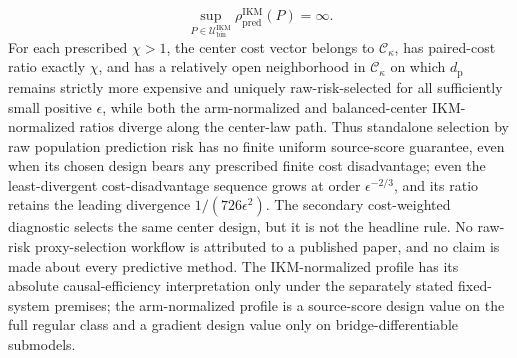 \[
 \sup_{P\in\mathcal U_{\mathrm{bin}}^{\mathrm{IKM}}}
 \rho_{\mathrm{pred}}^{\mathrm{IKM}}(P)=\infty.
\]
For each prescribed \(\chi>1\), the center cost vector belongs to \(\mathcal C_\kappa\), has paired-cost ratio exactly \(\chi\), and has a relatively open neighborhood in \(\mathcal C_\kappa\) on which \(d_{\mathrm p}\) remains strictly more expensive and uniquely raw-risk-selected for all sufficiently small positive \(\epsilon\), while both the arm-normalized and balanced-center IKM-normalized ratios diverge along the center-law path. Thus standalone selection by raw population prediction risk has no finite uniform source-score guarantee, even when its chosen design bears any prescribed finite cost disadvantage; even the least-divergent cost-disadvantage sequence grows at order \(\epsilon^{-2/3}\), and its ratio retains the leading divergence \(1/(726\epsilon^2)\). The secondary cost-weighted diagnostic selects the same center design, but it is not the headline rule. No raw-risk proxy-selection workflow is attributed to a published paper, and no claim is made about every predictive method. The IKM-normalized profile has its absolute causal-efficiency interpretation only under the separately stated fixed-system premises; the arm-normalized profile is a source-score design value on the full regular class and a gradient design value only on bridge-differentiable submodels.